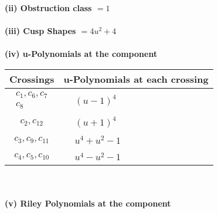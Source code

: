 \documentclass[1p]{elsarticle_modified}
\theoremstyle{definition}
\begin{document}
\flushleft \textbf{(ii) Obstruction class $= 1$}\\~\\
\flushleft \textbf{(iii) Cusp Shapes $= 4 u^2+4$}\\~\\
\newpage\renewcommand{\arraystretch}{1}
\flushleft \textbf{(iv) u-Polynomials at the component}\newline \\
\begin{tabular}{m{50pt}|m{274pt}}
Crossings & \hspace{64pt}u-Polynomials at each crossing \\
\hline $$\begin{aligned}c_{1},c_{6},c_{7}\\c_{8}\end{aligned}$$&$\begin{aligned}
&(u-1)^4
\end{aligned}$\\
\hline $$\begin{aligned}c_{2},c_{12}\end{aligned}$$&$\begin{aligned}
&(u+1)^4
\end{aligned}$\\
\hline $$\begin{aligned}c_{3},c_{9},c_{11}\end{aligned}$$&$\begin{aligned}
&u^4+u^2-1
\end{aligned}$\\
\hline $$\begin{aligned}c_{4},c_{5},c_{10}\end{aligned}$$&$\begin{aligned}
&u^4- u^2-1
\end{aligned}$\\
\hline
\end{tabular}\\~\\
\newpage\renewcommand{\arraystretch}{1}
\flushleft \textbf{(v) Riley Polynomials at the component}\newline \\
\end{document}

